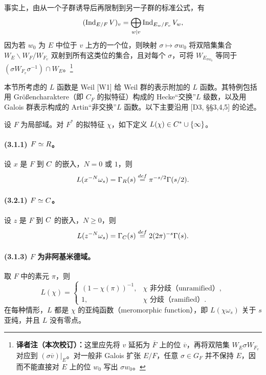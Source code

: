 事实上，由从一个子群诱导后再限制到另一子群的标准公式，有
\[
 (\operatorname{Ind}_{E/F}V)_v=\bigoplus_{w\mid v}\operatorname{Ind}_{E_w/F_v}V_w,
\]
因为若 $w_0$ 为 $E$ 中位于 $v$ 上方的一个位，则映射 $\sigma\mapsto\sigma w_0$ 将双陪集集合 $W_E\backslash W_F/W_{F_v}$ 双射到所有这类位的集合，且对每个 $\sigma$，可将 $W_{E_{\sigma w_0}}$ 等同于 $(\sigma W_{F_v}\sigma^{-1})\cap W_E$。\footnote{\textbf{译者注（本次校订）：}这里应先将 $v$ 延拓为 $\overline F$ 上的位 $\overline v$，再将双陪集 $W_E\sigma W_{F_v}$ 对应到 $(\sigma\overline v)|_E$。对一般非 Galois 扩张 $E/F$，任意 $\sigma\in G_F$ 并不保持 $E$，因而不能直接对 $E$ 上的位 $w_0$ 写出 $\sigma w_0$。}

本节所考虑的 $L$ 函数是 Weil [W1] 给 Weil 群的表示附加的 $L$ 函数。其特例包括用 Größencharaktere（即 $C_F$ 的拟特征）构成的 Hecke“交换”$L$ 级数，以及用 Galois 群表示构成的 Artin“非交换”$L$ 函数。以下主要沿用 [D3, §§3,4,5] 的论述。

设 $F$ 为局部域。对 $F^*$ 的拟特征 $\chi$，如下定义 $L(\chi)\in C^*\cup\{\infty\}$。

\paragraph*{(3.1.1) $F\simeq R$。}
设 $x$ 是 $F$ 到 $C$ 的嵌入，$N=0$ 或 $1$，则
\[
 L(x^{-N}\omega_s)=\Gamma_{R}(s)\overset{def}=\pi^{-s/2}\Gamma(s/2).
\]
\paragraph*{(3.2.1) $F\simeq C$。}
设 $z$ 是 $F$ 到 $C$ 的嵌入，$N\geq0$，则
\[
 L(z^{-N}\omega_s)=\Gamma_{C}(s)\overset{def}=2(2\pi)^{-s}\Gamma(s).
\]
\paragraph*{(3.1.3) $F$ 为非阿基米德域。}
取 $F$ 中的素元 $\pi$，则
\[
 L(\chi)=\begin{cases}(1-\chi(\pi))^{-1},&\chi\text{ 非分歧（unramified）},\\
 1,&\chi\text{ 分歧（ramified）}.
 \end{cases}
\]
在每种情形，$L$ 都是 $\chi$ 的亚纯函数（meromorphic function），即 $L(\chi\omega_s)$ 关于 $s$ 亚纯，并且 $L$ 没有零点。

